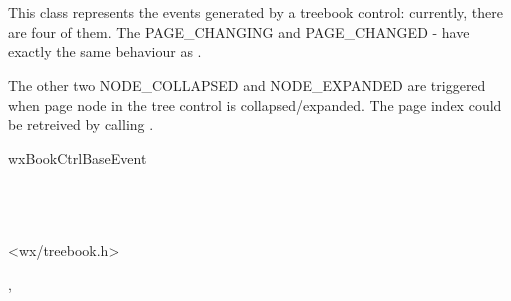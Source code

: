 
\section{}\label{wxtreebookevent}

This class represents the events generated by a treebook control: currently,
there are four of them. The PAGE\_CHANGING and PAGE\_CHANGED - have exactly the same
behaviour as .

The other two NODE\_COLLAPSED and NODE\_EXPANDED are triggered when page node in the tree control
is collapsed/expanded. The page index could be retreived by calling
.




wxBookCtrlBaseEvent\\
\\
\\
\\




<wx/treebook.h>








, 





\label{wxtreebookeventwxtreebookevent}


